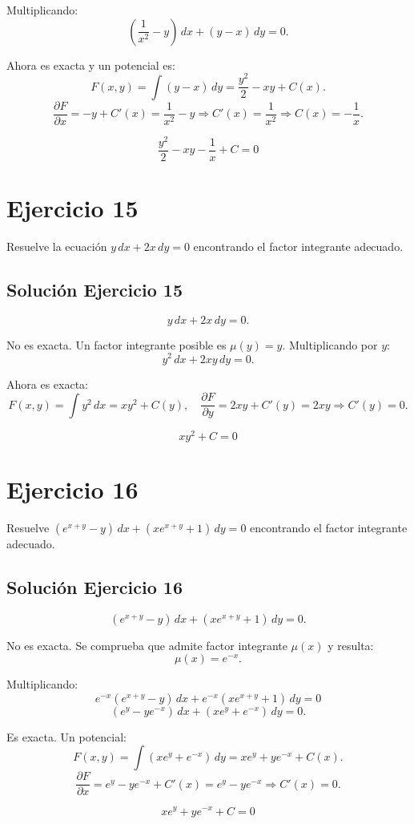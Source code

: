 \documentclass[12pt]{article}
\begin{document}
Multiplicando:
\[
\left(\frac{1}{x^2}-y\right)\,dx+(y-x)\,dy=0.
\]

Ahora es exacta y un potencial es:
\[
F(x,y)=\int (y-x)\,dy=\frac{y^2}{2}-xy+C(x).
\]
\[
\frac{\partial F}{\partial x}=-y+C'(x)=\frac{1}{x^2}-y
\Rightarrow C'(x)=\frac{1}{x^2}\Rightarrow C(x)=-\frac{1}{x}.
\]

\[
\boxed{\,\frac{y^2}{2}-xy-\frac{1}{x}+C=0\,}
\]

\section*{Ejercicio 15}
Resuelve la ecuación $y\,dx + 2x\,dy = 0$ encontrando el factor integrante adecuado.

\subsection*{Solución Ejercicio 15}

\[
y\,dx+2x\,dy=0.
\]

No es exacta. Un factor integrante posible es \(\mu(y)=y\).
Multiplicando por \(y\):
\[
y^2\,dx+2xy\,dy=0.
\]

Ahora es exacta:
\[
F(x,y)=\int y^2\,dx=xy^2+C(y),
\quad
\frac{\partial F}{\partial y}=2xy+C'(y)=2xy
\Rightarrow C'(y)=0.
\]

\[
\boxed{\,xy^2+C=0\,}
\]

\section*{Ejercicio 16}
Resuelve $(e^{x+y} - y)\,dx + (x e^{x+y} + 1)\,dy = 0$ encontrando el factor integrante adecuado.

\subsection*{Solución Ejercicio 16}

\[
(e^{x+y}-y)\,dx+(xe^{x+y}+1)\,dy=0.
\]

No es exacta. Se comprueba que admite factor integrante \(\mu(x)\) y resulta:
\[
\boxed{\mu(x)=e^{-x}}.
\]

Multiplicando:
\[
e^{-x}(e^{x+y}-y)\,dx+e^{-x}(xe^{x+y}+1)\,dy=0
\]
\[
(e^y-ye^{-x})\,dx+(xe^y+e^{-x})\,dy=0.
\]

Es exacta. Un potencial:
\[
F(x,y)=\int (xe^y+e^{-x})\,dy=xe^y+ye^{-x}+C(x).
\]
\[
\frac{\partial F}{\partial x}=e^y-ye^{-x}+C'(x)=e^y-ye^{-x}
\Rightarrow C'(x)=0.
\]

\[
\boxed{\,xe^y+ye^{-x}+C=0\,}
\]
\end{document}
